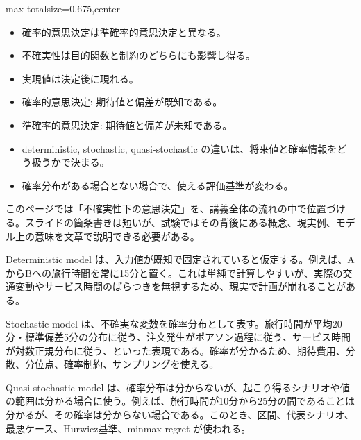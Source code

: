 \clearpage
{}
\begin{adjustbox}{max totalsize={\textwidth}{0.675\textheight},center}
\begin{minipage}{\textwidth}\scriptsize
\begin{minipage}[t]{0.485\textwidth}
\begin{itemize}
\item 確率的意思決定は準確率的意思決定と異なる。
\item 不確実性は目的関数と制約のどちらにも影響し得る。
\item 実現値は決定後に現れる。
\item 確率的意思決定: 期待値と偏差が既知である。
\item 準確率的意思決定: 期待値と偏差が未知である。
\end{itemize}
\begin{itemize}
\item deterministic, stochastic, quasi-stochastic の違いは、将来値と確率情報をどう扱うかで決まる。
\item 確率分布がある場合とない場合で、使える評価基準が変わる。
\end{itemize}
\end{minipage}\hfill
\begin{minipage}[t]{0.485\textwidth}
このページでは「不確実性下の意思決定」を、講義全体の流れの中で位置づける。スライドの箇条書きは短いが、試験ではその背後にある概念、現実例、モデル上の意味を文章で説明できる必要がある。\par
Deterministic model は、入力値が既知で固定されていると仮定する。例えば、AからBへの旅行時間を常に15分と置く。これは単純で計算しやすいが、実際の交通変動やサービス時間のばらつきを無視するため、現実で計画が崩れることがある。\par
Stochastic model は、不確実な変数を確率分布として表す。旅行時間が平均20分・標準偏差5分の分布に従う、注文発生がポアソン過程に従う、サービス時間が対数正規分布に従う、といった表現である。確率が分かるため、期待費用、分散、分位点、確率制約、サンプリングを使える。\par
Quasi-stochastic model は、確率分布は分からないが、起こり得るシナリオや値の範囲は分かる場合に使う。例えば、旅行時間が10分から25分の間であることは分かるが、その確率は分からない場合である。このとき、区間、代表シナリオ、最悪ケース、Hurwicz基準、minmax regret が使われる。\par

\end{minipage}
\end{minipage}
\end{adjustbox}
